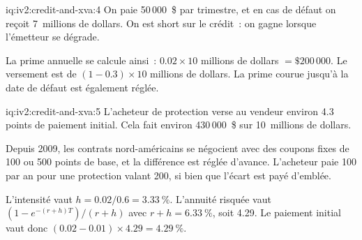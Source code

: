 \begin{solution}{iq:iv2:credit-and-xva:4}
On paie 50\,000~\$ par trimestre, et en cas de défaut on reçoit 7~millions de dollars. On est short sur le crédit~: on gagne lorsque l'émetteur se dégrade.

La prime annuelle se calcule ainsi~: $0.02 \times 10$ millions de dollars $= \$200\,000$. Le versement est de $(1 - 0.3) \times 10$ millions de dollars. La prime courue jusqu'à la date de défaut est également réglée.

\end{solution}

\begin{solution}{iq:iv2:credit-and-xva:5}
L'acheteur de protection verse au vendeur environ 4.3 points de paiement initial. Cela fait environ 430\,000~\$ sur 10~millions de dollars.

Depuis 2009, les contrats nord-américains se négocient avec des coupons fixes de 100 ou 500 points de base, et la différence est réglée d'avance. L'acheteur paie 100 par an pour une protection valant 200, si bien que l'écart est payé d'emblée.

L'intensité vaut $h = 0.02/0.6 = 3.33~\%$. L'annuité risquée vaut $(1 - e^{-(r + h)T})/(r + h)$ avec $r + h = 6.33~\%$, soit 4.29. Le paiement initial vaut donc $(0.02 - 0.01) \times 4.29 = 4.29~\%$.

\end{solution}

